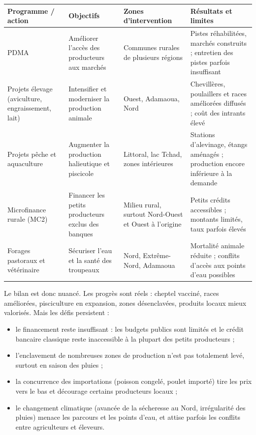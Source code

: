 \documentclass[11pt]{article}
\newcommand{\cle}[1]{{\popxbold\color{popdark}#1}}
\begin{document}
\begin{center}
\begin{tabularx}{\linewidth}{|l|X|X|X|}
\hline
\rowcolor{popblueL} \textbf{Programme / action} & \textbf{Objectifs} & \textbf{Zones d'intervention} & \textbf{Résultats et limites} \\
\hline
PDMA & Améliorer l'accès des producteurs aux marchés & Communes rurales de plusieurs régions & Pistes réhabilitées, marchés construits ; entretien des pistes parfois insuffisant \\
\hline
Projets élevage (aviculture, engraissement, lait) & Intensifier et moderniser la production animale & Ouest, Adamaoua, Nord & Chevillères, poulaillers et races améliorées diffusés ; coût des intrants élevé \\
\hline
Projets pêche et aquaculture & Augmenter la production halieutique et piscicole & Littoral, lac Tchad, zones intérieures & Stations d'alevinage, étangs aménagés ; production encore inférieure à la demande \\
\hline
Microfinance rurale (MC2) & Financer les petits producteurs exclus des banques & Milieu rural, surtout Nord-Ouest et Ouest à l'origine & Petits crédits accessibles ; montants limités, taux parfois élevés \\
\hline
Forages pastoraux et vétérinaire & Sécuriser l'eau et la santé des troupeaux & Nord, Extrême-Nord, Adamaoua & Mortalité animale réduite ; conflits d'accès aux points d'eau possibles \\
\hline
\end{tabularx}
\end{center}

Le bilan est donc \cle{nuancé}. Les progrès sont réels : cheptel vacciné, races améliorées, pisciculture en expansion, zones désenclavées, produits locaux mieux valorisés. Mais les défis persistent :

\begin{itemize}
\item le \cle{financement} reste insuffisant : les budgets publics sont limités et le crédit bancaire classique reste inaccessible à la plupart des petits producteurs ;
\item l'\cle{enclavement} de nombreuses zones de production n'est pas totalement levé, surtout en saison des pluies ;
\item la \cle{concurrence des importations} (poisson congelé, poulet importé) tire les prix vers le bas et décourage certains producteurs locaux ;
\item le \cle{changement climatique} (avancée de la sécheresse au Nord, irrégularité des pluies) menace les parcours et les points d'eau, et attise parfois les conflits entre agriculteurs et éleveurs.
\end{itemize}
\end{document}
